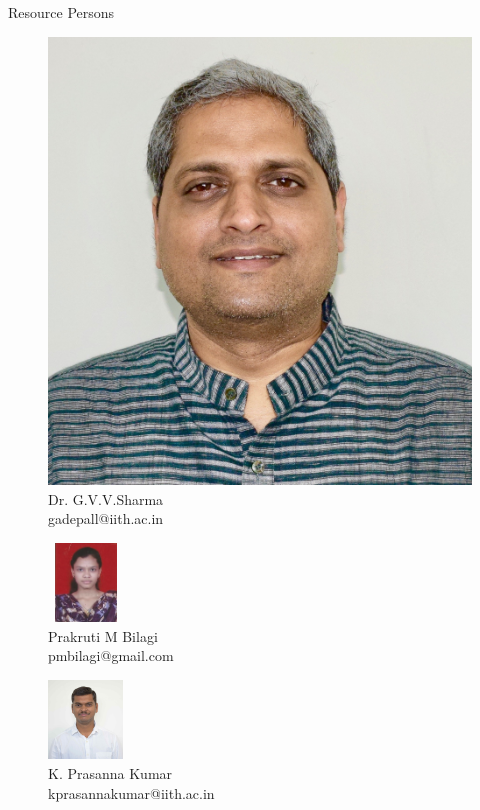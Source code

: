 \documentclass{beamer}
\begin{document}
\begin{frame}{Resource Persons}
\begin{center}
\begin{figure}
\includegraphics[scale=0.04]{GIMG/sharma.png}\\
Dr. G.V.V.Sharma\\
gadepall@iith.ac.in
\end{figure}
\vspace{0.75cm}
\begin{minipage}{0.47 \textwidth}
\begin{figure}
\centering
\includegraphics[width=2cm,height=2.1cm]{GIMG/Prakurti.jpg}\\
Prakruti M Bilagi\\
pmbilagi@gmail.com
\end{figure}
\end{minipage}
\begin{minipage}{0.5 \textwidth}
\begin{figure}
\centering
\includegraphics[width=2cm,height=2.1cm]{GIMG/Prasanna.jpg}\\
K. Prasanna Kumar\\
kprasannakumar@iith.ac.in
\end{figure}
\end{minipage}
\end{center}

\end{frame}
\end{document}
